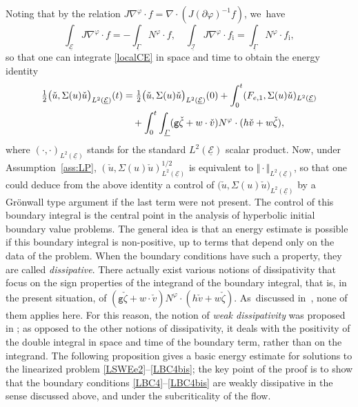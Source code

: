 \documentclass[11pt]{article}
\newcommand{\gr}{{\mathtt g}}
\newcommand{\cI}{{\mathcal I}}
\newcommand{\cE}{{\mathcal E}}
\newcommand{\ul}[1]{\underline{#1}}
\newcommand{\itGamma}{\mathit{\Gamma}}
\theoremstyle{definition}
\begin{document}
Noting that by the relation $J\nabla^\varphi\cdot f=\nabla\cdot(J(\partial\varphi)^{-1}f)$, we~have
\begin{equation}\label{DivTh}
\int_{\ul{\cE}}J\nabla^\varphi\cdot f = -\int_{\ul{\itGamma}}N^\varphi\cdot f, \quad
\int_{\ul{\cI}}J\nabla^\varphi\cdot f_\mathrm{i} = \int_{\ul{\itGamma}}N^\varphi\cdot f_\mathrm{i},
\end{equation}
so that one can integrate \eqref{localCE} in space and time to obtain the energy identity
\begin{align}\label{weakdissip0}
\tfrac{1}{2} \big(\check{u},\Sigma(u)\check{u}\big)_{L^2(\ul{\cE})}(t)
&= \tfrac{1}{2} \big(\check{u},\Sigma(u)\check{u}\big)_{L^2(\ul{\cE})}(0)
+ \int_0^t (F_{{\rm e},1},\Sigma(u)\check{u})_{L^2(\ul{\cE})} \\
&\quad
+ \int_0^t \int_{\ul\itGamma} (\gr\check{\zeta}+w\cdot\check{v}) N^\varphi\cdot (h\check{v}+w\check{\zeta}), \nonumber
\end{align}
where $(\cdot,\cdot)_{L^2(\ul{\cE})}$ stands for the standard $L^2(\ul{\cE})$ scalar product.
Now, under Assumption~\ref{ass:LP}, $(\check{u},\Sigma(u)\check{u})_{L^2(\ul{\cE})}^{1/2}$ is equivalent to $\Vert \cdot \Vert_{L^2(\ul{\cE})}$,
so that one could deduce from the above identity a control of $\big(\check{u},\Sigma(u)\check{u}\big)_{L^2(\ul{\cE})}$ by a Grönwall type argument
if the last term were not present.
The control of this boundary integral is the central point in the analysis of hyperbolic initial boundary value problems.
The general idea is that an energy estimate is possible if this boundary integral is non-positive, up to terms that depend only on the data of the problem.
When the boundary conditions have such a property, they are called {\it dissipative}.
There actually exist various notions of dissipativity that focus on the sign properties of the integrand of the boundary integral, that is,
in the present situation, of $(\gr\check{\zeta}+w\cdot\check{v}) N^\varphi\cdot (h\check{v}+w\check{\zeta})$. As~discussed in~\cite{IguchiLannes2023}, none of them applies here.
For this reason, the notion of {\it weak dissipativity} was proposed in \cite{IguchiLannes2023}; as opposed to the other notions of dissipativity,
it deals with the positivity of the double integral in space and time of the boundary term, rather than on the integrand.
The following proposition gives a basic energy estimate for solutions to the linearized problem \eqref{LSWEe2}--\eqref{LBC4bis};
the key point of the proof is to show that the boundary conditions \eqref{LBC4}--\eqref{LBC4bis} are weakly dissipative in the sense discussed above,
and under the subcriticality of the flow.
\end{document}
